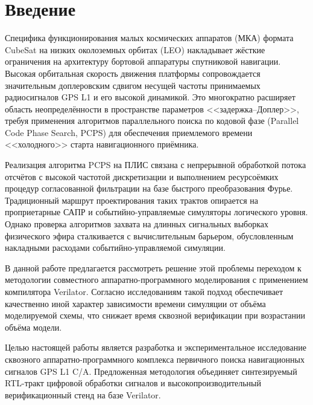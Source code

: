 \section{Введение}

Специфика функционирования малых космических аппаратов (МКА) формата CubeSat на низких околоземных орбитах (LEO) накладывает жёсткие ограничения на архитектуру бортовой аппаратуры спутниковой навигации. Высокая орбитальная скорость движения платформы сопровождается значительным доплеровским сдвигом несущей частоты принимаемых радиосигналов GPS L1 и его высокой динамикой. Это многократно расширяет область неопределённости в пространстве параметров <<задержка--Доплер>>, требуя применения алгоритмов параллельного поиска по кодовой фазе (Parallel Code Phase Search, PCPS) для обеспечения приемлемого времени <<холодного>> старта навигационного приёмника.

Реализация алгоритма PCPS на ПЛИС связана с непрерывной обработкой потока отсчётов с высокой частотой дискретизации и выполнением ресурсоёмких процедур согласованной фильтрации на базе быстрого преобразования Фурье. Традиционный маршрут проектирования таких трактов опирается на проприетарные САПР и событийно-управляемые симуляторы логического уровня. Однако проверка алгоритмов захвата на длинных сигнальных выборках физического эфира сталкивается с вычислительным барьером, обусловленным накладными расходами событийно-управляемой симуляции.

В данной работе предлагается рассмотреть решение этой проблемы переходом к методологии совместного аппаратно-программного моделирования с применением компилятора Verilator. Согласно исследованиям \cite{cornell, ieee_ble} такой подход обеспечивает качественно иной характер зависимости времени симуляции от объёма моделируемой схемы, что снижает время сквозной верификации при возрастании объёма модели.

Целью настоящей работы является разработка и экспериментальное исследование сквозного аппаратно-программного комплекса первичного поиска навигационных сигналов GPS L1 C/A. Предложенная методология объединяет синтезируемый RTL-тракт цифровой обработки сигналов и высокопроизводительный верификационный стенд на базе Verilator.
